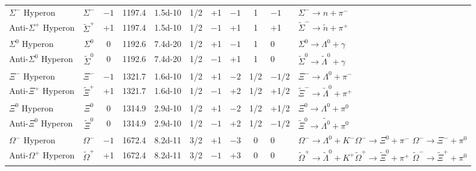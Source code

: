 \documentclass[fontsize=9pt,twoside]{scrbook}
\begin{document}
\begin{small}
\begin{center}
\begin{longtable}{p{3cm}ccccccccp{1.75cm}p{2.75cm}}
$\Sigma^{-}$ Hyperon & $\Sigma^{-}$ & $-1$ & 1197.4 & \num{1.5d-10} & 1/2 & +1 & $-1$ & 1 &$-1$ & $\Sigma^{-} \to n + \pi^{-}$ \\
Anti-$\Sigma^{+}$ Hyperon & $\tilde{\Sigma}^{+}$ & +1 & 1197.4 &  \num{1.5d-10} & 1/2 &$-1$ & +1 & 1 & +1 & $\tilde{\Sigma}^{-} \to \tilde{n} + \pi^{+}$ \\
$\Sigma^{0}$ Hyperon& $\Sigma^{0}$ & 0 & 1192.6 & \num{7.4d-20} & 1/2 & +1 &$-1$ & 1 & 0 & $\Sigma^{0} \to \Lambda^{0} + \gamma$ \\
Anti-$\Sigma^{0}$ Hyperon & $\tilde{\Sigma}^{0}$ & 0 & 1192.6 & \num{7.4d-20} & 1/2 &$-1$ & +1 & 1 & 0 & $\tilde{\Sigma}^{0} \to \tilde{\Lambda}^{0} + \gamma$ \\
$\Xi^{-}$ Hyperon& $\Xi^{-}$ &$-1$ & 1321.7 & \num{1.6d-10} & 1/2 & +1 & $-2$ & 1/2 & $-1/2$ & $\Xi^{-} \to \Lambda^{0} +\pi^{-}$ \\
Anti-$\Xi^{+}$ Hyperon& $\tilde{\Xi}^{+}$ & +1 & 1321.7 & \num{1.6d-10} & 1/2 &$-1$ & +2 & 1/2 & +1/2 & $\tilde{\Xi}^{-} \to \tilde{\Lambda}^{0} + \pi^{+}$ \\
$\Xi^{0}$ Hyperon& $\Xi^{0}$ & 0 & 1314.9 & \num{2.9d-10} & 1/2 & +1 & $-2$ & 1/2 & +1/2 & $\Xi^{0} \to \Lambda^{0} + \pi^{0}$ \\
Anti-$\Xi^{0}$ Hyperon& $\tilde{\Xi}^{0}$ & 0 & 1314.9 & \num{2.9d-10} & 1/2 &$-1$ & +2 & 1/2 & $-1/2$ & $\tilde{\Xi}^{0} \to \tilde{\Lambda^{0}} + \pi^{0}$ \\
$\Omega^{-}$ Hyperon& $\Omega^{-}$ &$-1$ & 1672.4 & \num{8.2d-11} & 3/2 & +1 & $-3$ & 0 & 0 & $\Omega^{-} \to \Lambda^{0}+ K^{-}$\newline $\Omega^{-} \to  \Xi^{0} + \pi^{-}$ \newline $\Omega^{-} \to \Xi^{-} + \pi^{0}$\\
Anti-$\Omega^{+}$ Hyperon& $\tilde{\Omega}^{+}$ & +1 & 1672.4 & \num{8.2d-11} & 3/2 &$-1$ & +3 & 0 & 0 & $\tilde{\Omega}^{+} \to \tilde{\Lambda}^{0}+ K^{+}$\newline $\tilde{\Omega}^{+} \to  \tilde{\Xi}^{0} + \pi^{+}$ \newline $\tilde{\Omega}^{-} \to \tilde{\Xi}^{+} + \pi^{0}$ \\
\bottomrule
\end{longtable}
\end{center}
\end{small}
\end{document}
